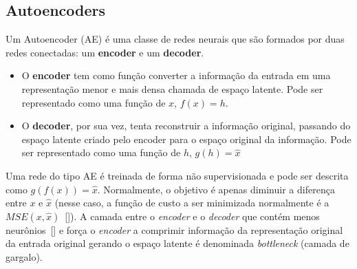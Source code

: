 \subsection{Autoencoders}
\label{ae_coding}
Um Autoencoder (\acrshort{AE}) é uma classe de redes neurais que são formados por duas redes conectadas: um \textbf{encoder} e um \textbf{decoder}.
\begin{itemize}
\item O \textbf{encoder} tem como função converter a informação da entrada em uma representação menor e mais densa chamada de espaço latente. Pode ser representado como uma função de $x$, $f(x) = h$.
\item O \textbf{decoder}, por sua vez, tenta reconstruir a informação original, passando do espaço latente criado pelo encoder para o espaço original da informação. Pode ser representado como uma função de $h$, $g(h) = \hat{x}$
\end{itemize} 
Uma rede do tipo \acrshort{AE} é treinada de forma não supervisionada e pode ser descrita como $g(f(x)) = \hat{x}$. Normalmente, o objetivo é apenas diminuir a diferença entre $x$ e $\hat{x}$ (nesse caso, a função de custo a ser minimizada normalmente é a $MSE(x, \hat{x})$~[]). A camada entre o \textit{encoder} e o \textit{decoder} que contém menos neurônios~[] e força o \textit{encoder} a comprimir informação da representação original da entrada original gerando o espaço latente é denominada \textit{bottleneck} (camada de gargalo). 

